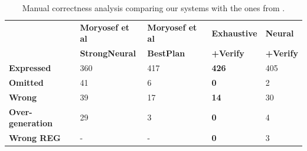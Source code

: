 \begin{table}[t]

\begin{center}
\resizebox{\linewidth}{!}
{
\begin{tabular}{|l|l|l||l|l|}
\hline
 & \textbf{Moryosef et al} & \textbf{Moryosef et al} & \textbf{Exhaustive} & \textbf{Neural} \\
 & \textbf{StrongNeural} & \textbf{BestPlan} & \textbf{+Verify} & \textbf{+Verify} \\ \hline
\textbf{Expressed} & 360 & 417 & \textbf{426} & 405 \\ \hline
\textbf{Omitted} & 41 & 6 & \textbf{0} & 2 \\ \hline
\textbf{Wrong} & 39 & 17 & \textbf{14} & 30 \\ \hline
\textbf{Over-generation} & 29 & 3 & \textbf{0} & 4 \\ \hline
\textbf{Wrong REG} & - & - & \textbf{0} & 3 \\ \hline
\end{tabular}
}
\end{center}
\caption{Manual correctness analysis comparing our systems with the ones from \citet{step-by-step}.}
\label{table:manual}
\end{table}